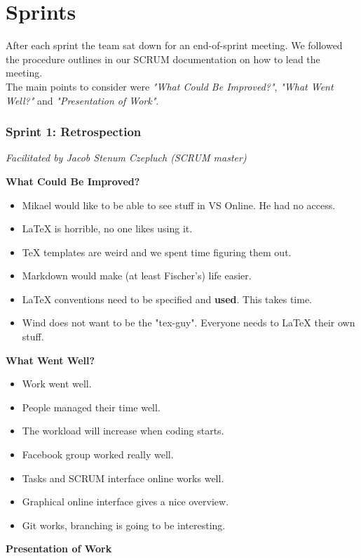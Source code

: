 \section{Sprints}
After each sprint the team sat down for an end-of-sprint meeting. We followed the procedure outlines in our SCRUM documentation on how to lead the meeting.\\
The main points to consider were \textit{"What Could Be Improved?"}, \textit{"What Went Well?"} and \textit{"Presentation of Work"}.
\subsubsection{Sprint 1: Retrospection}
\small{\textit{Facilitated by Jacob Stenum Czepluch (SCRUM master)}} 

\textbf{What Could Be Improved?}

\begin{itemize}
	\item Mikael would like to be able to see stuff in VS Online. He had no access.
	\item LaTeX is horrible, no one likes using it.
	\item TeX templates are weird and we spent time figuring them out.
	\item Markdown would make (at least Fischer's) life easier. 
	\item LaTeX conventions need to be specified and \textbf{used}. This takes time.
	\item Wind does not want to be the "tex-guy". Everyone needs to LaTeX their own stuff.
\end{itemize}

\textbf{What Went Well?}

\begin{itemize}
	\item Work went well. 
	\item People managed their time well.
	\item The workload will increase when coding starts.
	\item Facebook group worked really well.
	\item Tasks and SCRUM interface online works well.
	\item Graphical online interface gives a nice overview.
	\item Git works, branching is going to be interesting. 
\end{itemize}

\textbf{Presentation of Work}

